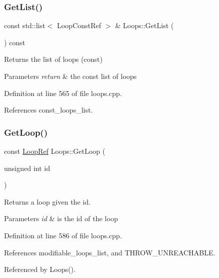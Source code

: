 \subsubsection{\texorpdfstring{Get\+List()}{GetList()}}
{\footnotesize\ttfamily const std\+::list$<$ Loop\+Const\+Ref $>$ \& Loops\+::\+Get\+List (\begin{DoxyParamCaption}{ }\end{DoxyParamCaption}) const}



Returns the list of loops (const) 


\begin{DoxyParams}{Parameters}
{\em return} & the const list of loops \\
\hline
\end{DoxyParams}


Definition at line 565 of file loops.\+cpp.



References const\+\_\+loops\+\_\+list.

\mbox{\label{classLoops_ae1017c5d90fca5a7717adf98d5b73712}} 
\subsubsection{\texorpdfstring{Get\+Loop()}{GetLoop()}}
{\footnotesize\ttfamily const \hyperlink{loop_8hpp_aa4a60313089619376f67557c4120423c}{Loop\+Ref} Loops\+::\+Get\+Loop (\begin{DoxyParamCaption}\item[{unsigned int}]{id }\end{DoxyParamCaption})}



Returns a loop given the id. 


\begin{DoxyParams}{Parameters}
{\em id} & is the id of the loop \\
\hline
\end{DoxyParams}


Definition at line 586 of file loops.\+cpp.



References modifiable\+\_\+loops\+\_\+list, and T\+H\+R\+O\+W\+\_\+\+U\+N\+R\+E\+A\+C\+H\+A\+B\+LE.



Referenced by Loops().

